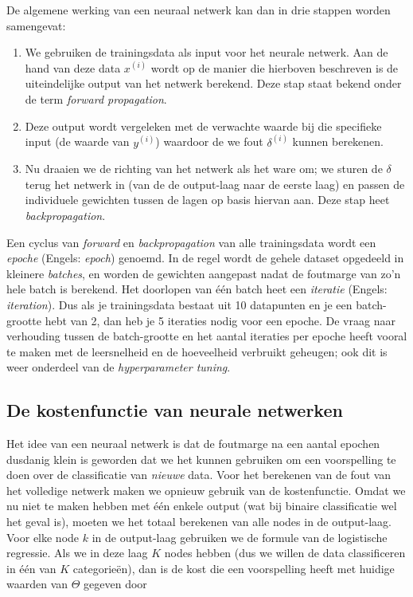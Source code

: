 De algemene werking van een neuraal netwerk kan dan in drie stappen worden samengevat:

\begin{enumerate}
\item
We gebruiken de trainingsdata als input voor het neurale netwerk. Aan de hand van deze data $x^{(i)}$ wordt op de manier die hierboven beschreven is de uiteindelijke output van het netwerk berekend. Deze stap staat bekend onder de term \textit{forward propagation}.

\item
Deze output wordt vergeleken met de verwachte waarde bij die specifieke input (de waarde van $y^{(i)}$) waardoor de we fout $\delta^{(i)}$ kunnen berekenen.

\item
Nu draaien we de richting van het netwerk als het ware om; we sturen de $\delta$ terug het netwerk in (van de de output-laag naar de eerste laag) en passen de individuele gewichten tussen de lagen op basis hiervan aan. Deze stap heet \textit{backpropagation}.

\end{enumerate}

Een cyclus van \textit{forward} en \textit{backpropagation} van alle trainingsdata wordt een \textit{epoche} (Engels: \textit{epoch}) genoemd. In de regel wordt de gehele dataset opgedeeld in kleinere \textit{batches}, en worden de gewichten aangepast nadat de foutmarge van zo'n hele batch is berekend. Het doorlopen van één batch heet een \textit{iteratie} (Engels: \textit{iteration}). Dus als je trainingsdata bestaat uit 10 datapunten en je een batch-grootte hebt van 2, dan heb je 5 iteraties nodig voor een epoche. De vraag naar verhouding tussen de batch-grootte en het aantal iteraties per epoche heeft vooral te maken met de leersnelheid en de hoeveelheid verbruikt geheugen; ook dit is weer onderdeel van de \textit{hyperparameter tuning}.


\subsection{De kostenfunctie van neurale netwerken}
Het idee van een neuraal netwerk is dat de foutmarge na een aantal epochen dusdanig klein is geworden dat we het kunnen gebruiken om een voorspelling te doen over de classificatie van \textit{nieuwe} data. Voor het berekenen van de fout van het volledige netwerk maken we opnieuw gebruik van de kostenfunctie. Omdat we nu niet te maken hebben met één enkele output (wat bij binaire classificatie wel het geval is), moeten we het totaal berekenen van alle nodes in de output-laag. Voor elke node $k$ in de output-laag gebruiken we de formule van de logistische regressie. Als we in deze laag $K$ nodes hebben (dus we willen de data classificeren in één van $K$ categorieën), dan is de kost die een voorspelling heeft met huidige waarden van $\Theta$ gegeven door 

